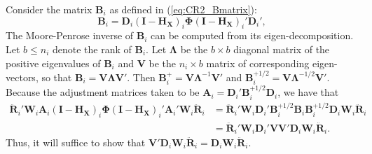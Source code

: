 \documentclass[12pt]{article}
\begin{document}
Consider the matrix \(\mathbf{B}_i\) as defined in
(\ref{eq:CR2_Bmatrix}): \[
\mathbf{B}_i = \mathbf{D}_i\left(\mathbf{I} - \mathbf{H_X}\right)_i \boldsymbol\Phi \left(\mathbf{I} - \mathbf{H_X}\right)_i' \mathbf{D}_i',
\] The Moore-Penrose inverse of \(\mathbf{B}_i\) can be computed from
its eigen-decomposition. Let \(b \leq n_i\) denote the rank of
\(\mathbf{B}_i\). Let \(\boldsymbol\Lambda\) be the \(b \times b\)
diagonal matrix of the positive eigenvalues of \(\mathbf{B}_i\) and
\(\mathbf{V}\) be the \(n_i \times b\) matrix of corresponding
eigen-vectors, so that
\(\mathbf{B}_i = \mathbf{V}\boldsymbol\Lambda\mathbf{V}'\). Then
\(\mathbf{B}_i^+ = \mathbf{V}\boldsymbol\Lambda^{-1}\mathbf{V}'\) and
\(\mathbf{B}_i^{+1/2} = \mathbf{V}\boldsymbol\Lambda^{-1/2}\mathbf{V}'\).
Because the adjustment matrices taken to be
\(\mathbf{A}_i = \mathbf{D}_i' \mathbf{B}_i^{+1/2} \mathbf{D}_i\), we
have that \begin{equation}\begin{aligned}
\label{eq:step1}
\mathbf{\ddot{R}}_i' \mathbf{W}_i \mathbf{A}_i \left(\mathbf{I} - \mathbf{H_X}\right)_i \boldsymbol\Phi \left(\mathbf{I} - \mathbf{H_X}\right)_i' \mathbf{A}_i' \mathbf{W}_i \mathbf{\ddot{R}}_i &= \mathbf{\ddot{R}}_i' \mathbf{W}_i \mathbf{D}_i' \mathbf{B}_i^{+1/2} \mathbf{B}_i \mathbf{B}_i^{+1/2} \mathbf{D}_i \mathbf{W}_i \mathbf{\ddot{R}}_i \\
&= \mathbf{\ddot{R}}_i' \mathbf{W}_i \mathbf{D}_i' \mathbf{V}\mathbf{V}' \mathbf{D}_i \mathbf{W}_i \mathbf{\ddot{R}}_i. 
\end{aligned}\end{equation} Thus, it will suffice to show that
\(\mathbf{V}'\mathbf{D}_i \mathbf{W}_i \mathbf{\ddot{R}}_i = \mathbf{D}_i \mathbf{W}_i \mathbf{\ddot{R}}_i\).
\end{document}
